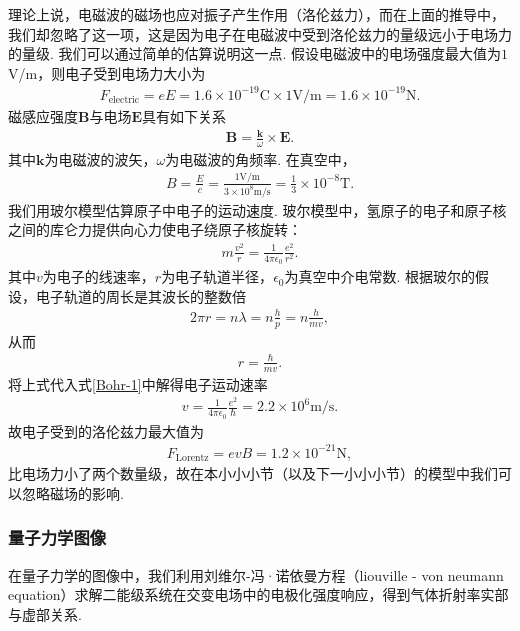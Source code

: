 \documentclass[a4paper, 10pt]{article}
\begin{document}
\begin{multicols}{2}
理论上说，电磁波的磁场也应对振子产生作用（洛伦兹力），而在上面的推导中，我们却忽略了这一项，这是因为电子在电磁波中受到洛伦兹力的量级远小于电场力的量级. 我们可以通过简单的估算说明这一点. 假设电磁波中的电场强度最大值为$1$V/m，则电子受到电场力大小为
\begin{align}
    F_{\text{electric}}=eE=1.6\times 10^{-19}\text{C}\times 1\text{V/m}=1.6\times 10^{-19}\text{N}.
\end{align}
磁感应强度$\bm{B}$与电场$\bm{E}$具有如下关系
\begin{align}
    \bm{B}=\frac{\bm{k}}{\omega}\times\bm{E}.
\end{align}
其中$\bm{k}$为电磁波的波矢，$\omega$为电磁波的角频率.
在真空中，
\begin{align}
    B=\frac{E}{c}=\frac{1\text{V/m}}{3\times 10^8\text{m/s}}=\frac{1}{3}\times 10^{-8}\text{T}.
\end{align}
我们用玻尔模型估算原子中电子的运动速度. 玻尔模型中，氢原子的电子和原子核之间的库仑力提供向心力使电子绕原子核旋转：
\begin{align}
    \label{Bohr-1}
    m\frac{v^2}{r}=\frac{1}{4\pi\epsilon_0}\frac{e^2}{r^2}.
\end{align}
其中$v$为电子的线速率，$r$为电子轨道半径，$\epsilon_0$为真空中介电常数. 根据玻尔的假设，电子轨道的周长是其波长的整数倍
\begin{align}
    2\pi r=n\lambda=n\frac{h}{p}=n\frac{h}{mv},
\end{align}
从而
\begin{align}
    r=\frac{\hbar}{mv}.
\end{align}
将上式代入式\eqref{Bohr-1}中解得电子运动速率
\begin{align}
    v=\frac{1}{4\pi\epsilon_0}\frac{e^2}{\hbar}=2.2\times 10^6\text{m/s}.
\end{align}
故电子受到的洛伦兹力最大值为
\begin{align}
    F_{\text{Lorentz}}=evB=1.2\times 10^{-21}\text{N},
\end{align}
比电场力小了两个数量级，故在本小小小节（以及下一小小小节）的模型中我们可以忽略磁场的影响.

\subsubsection{量子力学图像}
在量子力学的图像中，我们利用刘维尔-冯·诺依曼方程（liouville - von neumann equation）求解二能级系统在交变电场中的电极化强度响应，得到气体折射率实部与虚部关系.


\end{multicols}
\end{document}
